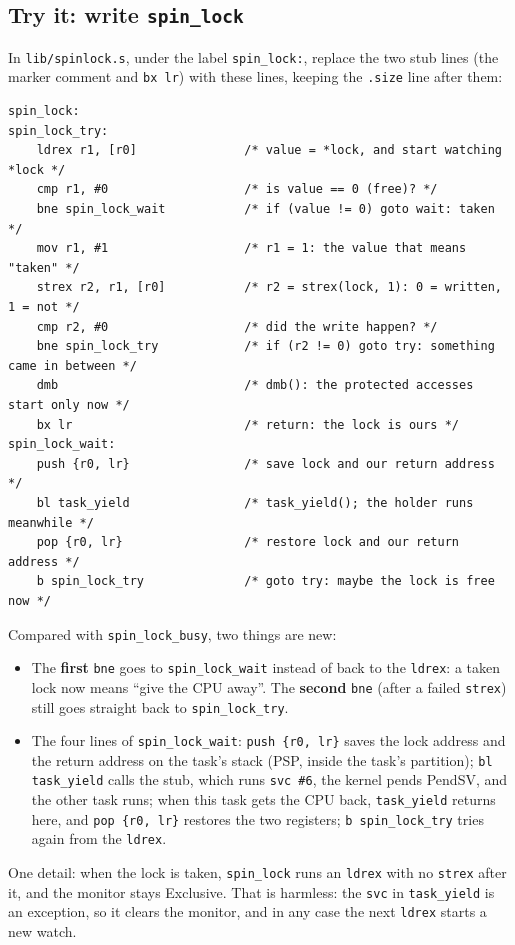 \subsection{Try it: write \texttt{spin\_lock}}
In \texttt{lib/spinlock.s}, under the label \texttt{spin\_lock:}, replace the two stub lines (the marker comment and \texttt{bx lr}) with these lines, keeping the \texttt{.size} line after them:
\begin{lstlisting}[basicstyle=\ttfamily\scriptsize]
spin_lock:
spin_lock_try:
    ldrex r1, [r0]               /* value = *lock, and start watching *lock */
    cmp r1, #0                   /* is value == 0 (free)? */
    bne spin_lock_wait           /* if (value != 0) goto wait: taken */
    mov r1, #1                   /* r1 = 1: the value that means "taken" */
    strex r2, r1, [r0]           /* r2 = strex(lock, 1): 0 = written, 1 = not */
    cmp r2, #0                   /* did the write happen? */
    bne spin_lock_try            /* if (r2 != 0) goto try: something came in between */
    dmb                          /* dmb(): the protected accesses start only now */
    bx lr                        /* return: the lock is ours */
spin_lock_wait:
    push {r0, lr}                /* save lock and our return address */
    bl task_yield                /* task_yield(); the holder runs meanwhile */
    pop {r0, lr}                 /* restore lock and our return address */
    b spin_lock_try              /* goto try: maybe the lock is free now */
\end{lstlisting}
Compared with \texttt{spin\_lock\_busy}, two things are new:
\begin{itemize}
    \item The \textbf{first} \texttt{bne} goes to \texttt{spin\_lock\_wait} instead of back to the \texttt{ldrex}: a taken lock now means ``give the CPU away''. The \textbf{second} \texttt{bne} (after a failed \texttt{strex}) still goes straight back to \texttt{spin\_lock\_try}.
    \item The four lines of \texttt{spin\_lock\_wait}: \texttt{push \{r0, lr\}} saves the lock address and the return address on the task's stack (PSP, inside the task's partition); \texttt{bl task\_yield} calls the stub, which runs \texttt{svc \#6}, the kernel pends PendSV, and the other task runs; when this task gets the CPU back, \texttt{task\_yield} returns here, and \texttt{pop \{r0, lr\}} restores the two registers; \texttt{b spin\_lock\_try} tries again from the \texttt{ldrex}.
\end{itemize}
One detail: when the lock is taken, \texttt{spin\_lock} runs an \texttt{ldrex} with no \texttt{strex} after it, and the monitor stays Exclusive. That is harmless: the \texttt{svc} in \texttt{task\_yield} is an exception, so it clears the monitor, and in any case the next \texttt{ldrex} starts a new watch.

